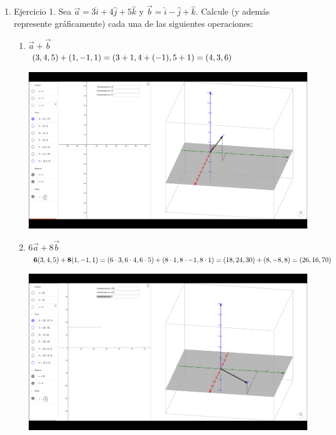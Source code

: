 \documentclass[10pt,letterpaper,fleqn]{article}
\begin{document}
    \begin{enumerate}

        \item Ejercicio 1. Sea $\overrightarrow{a} = 3\widehat{i} + 4\widehat{j}
        + 5\widehat{k}$ y $\overrightarrow{b} = \widehat{i} - \widehat{j} +
        \widehat{k}$. Calcule (y además represente gráficamente) cada una de las
        siguientes operaciones:
        \begin{enumerate}
          \item $\overrightarrow{a} + \overrightarrow{b}$ \\
            $ (3,4,5) + (1,-1,1) \\
              =(3+1,4+(-1),5+1) \\
              =(4,3,6)
            $
            \\
            \begin{center}
                \includegraphics[scale=.3]{assets/img/Ejercicio1(a).png}
            \end{center}
          \item $6 \overrightarrow{a} + 8 \overrightarrow{b}$ \\
            $
              {\bf 6}(3,4,5) + {\bf 8}(1,-1,1) \\
              = (6 \cdot 3, 6 \cdot 4, 6 \cdot 5) + (8 \cdot 1, 8 \cdot -1,
              8 \cdot 1) \\
              = (18,24,30) + (8,-8,8) \\
              = (26,16,70)
            $
            \\
            \begin{center}
                \includegraphics[scale=.3]{assets/img/Ejercicio1(b).png}

\end{center}
\end{enumerate}
\end{enumerate}
\end{document}
